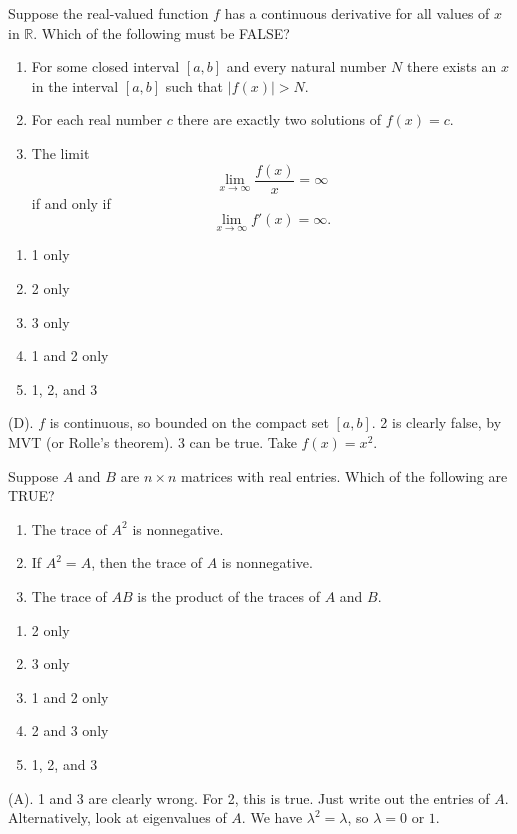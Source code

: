 \begin{exercise}
Suppose the real-valued function $f$ has a continuous derivative for all values of $x$ in $\mathbb{R}$. Which of the following must be FALSE?
\begin{enumerate}
    \item For some closed interval $[a,b]$ and every natural number $N$ there exists an $x$ in the interval $[a,b]$ such that $|f(x)|>N$.
    
    \item For each real number $c$ there are exactly two solutions of $f(x)=c$.
    
    \item The limit
    \[
    \lim_{x\to\infty}\frac{f(x)}{x}=\infty
    \]
    if and only if
    \[
    \lim_{x\to\infty}f'(x)=\infty.
    \]
\end{enumerate}
\begin{enumerate}[label=(\Alph*)]
    \item 1 only
    \item 2 only
    \item 3 only
    \item 1 and 2 only
    \item 1, 2, and 3
\end{enumerate}
\end{exercise}
\begin{solution}
(D). $f$ is continuous, so bounded on the compact set $[a,b]$. 2 is clearly false, by MVT (or Rolle's theorem).
3 can be true. Take $f(x) = x^2$.
\end{solution}

\begin{exercise}
Suppose $A$ and $B$ are $n\times n$ matrices with real entries. Which of the following are TRUE?

\begin{enumerate}
    \item The trace of $A^2$ is nonnegative.
    
    \item If $A^2=A$, then the trace of $A$ is nonnegative.
    
    \item The trace of $AB$ is the product of the traces of $A$ and $B$.
\end{enumerate}

\begin{enumerate}[label=(\Alph*)]
    \item 2 only
    \item 3 only
    \item 1 and 2 only
    \item 2 and 3 only
    \item 1, 2, and 3
\end{enumerate}
\end{exercise}
\begin{solution}
(A). 1 and 3 are clearly wrong. For 2, this is true. Just write out the entries of $A$.
Alternatively, look at eigenvalues of $A$. We have $\lambda^2 = \lambda$, so $\lambda = 0$ or $1$.
\end{solution}

